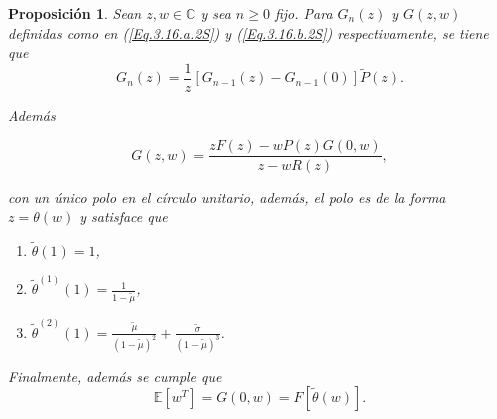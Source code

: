 \documentclass{article}
\newtheorem{Prop}{Proposición}
\newcommand{\esp}{\mathbb{E}}
\begin{document}
\begin{Prop}\label{Prop.1.1.2S}
Sean $z,w\in\mathbb{C}$ y sea $n\geq0$ fijo. Para $G_{n}\left(z\right)$ y $G\left(z,w\right)$ definidas como en (\ref{Eq.3.16.a.2S}) y (\ref{Eq.3.16.b.2S}) respectivamente, se tiene que
\begin{equation}\label{Eq.Pag.45}
G_{n}\left(z\right)=\frac{1}{z}\left[G_{n-1}\left(z\right)-G_{n-1}\left(0\right)\right]\tilde{P}\left(z\right).
\end{equation}

Adem\'as

\begin{equation}\label{Eq.Pag.46}
G\left(z,w\right)=\frac{zF\left(z\right)-wP\left(z\right)G\left(0,w\right)}{z-wR\left(z\right)},
\end{equation}

con un \'unico polo en el c\'irculo unitario, adem\'as, el polo es
de la forma $z=\theta\left(w\right)$ y satisface que

\begin{enumerate}
\item[i)]$\tilde{\theta}\left(1\right)=1$,

\item[ii)] $\tilde{\theta}^{(1)}\left(1\right)=\frac{1}{1-\tilde{\mu}}$,

\item[iii)]
$\tilde{\theta}^{(2)}\left(1\right)=\frac{\tilde{\mu}}{\left(1-\tilde{\mu}\right)^{2}}+\frac{\tilde{\sigma}}{\left(1-\tilde{\mu}\right)^{3}}$.
\end{enumerate}

Finalmente, adem\'as se cumple que
\begin{equation}
\esp\left[w^{T}\right]=G\left(0,w\right)=F\left[\tilde{\theta}\left(w\right)\right].
\end{equation}
\end{Prop}
\end{document}
